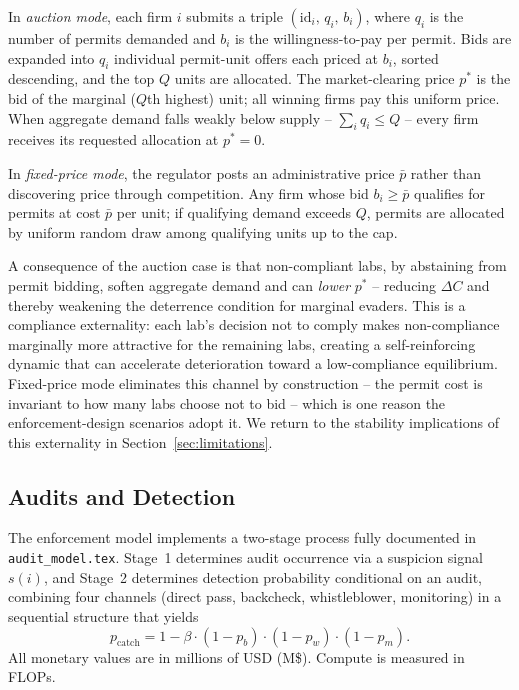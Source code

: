 In \emph{auction mode}, each firm $i$ submits a triple $(\text{id}_i,\, q_i,\, b_i)$, where $q_i$ is the number of permits demanded and $b_i$ is the willingness-to-pay per permit. Bids are expanded into $q_i$ individual permit-unit offers each priced at $b_i$, sorted descending, and the top $Q$ units are allocated. The market-clearing price $p^*$ is the bid of the marginal ($Q$th highest) unit; all winning firms pay this uniform price. When
aggregate demand falls weakly below supply -- $\sum_i q_i \leq Q$ -- every firm receives its requested allocation at $p^* = 0$.

In \emph{fixed-price mode}, the regulator posts an administrative price $\bar{p}$ rather than discovering price through competition. Any firm whose bid $b_i \geq \bar{p}$ qualifies for permits at cost $\bar{p}$ per unit; if qualifying demand exceeds $Q$, permits are allocated by uniform random draw among qualifying units up to the cap. 

A consequence of the auction case is that non-compliant labs, by abstaining from permit bidding, soften aggregate demand and can \emph{lower} $p^*$ -- reducing $\Delta C$ and thereby weakening the deterrence condition for marginal evaders. This is a compliance externality: each lab's decision not to comply makes non-compliance marginally more attractive for the remaining labs, creating a self-reinforcing dynamic that can accelerate deterioration toward a low-compliance equilibrium. Fixed-price mode eliminates this channel by construction -- the permit cost is invariant to how many labs choose not to bid -- which is one reason the enforcement-design scenarios adopt it. We return to the stability implications of this externality in Section~\ref{sec:limitations}.

\subsection{Audits and Detection}
The enforcement model implements a two-stage process fully documented in \\ \texttt{audit\_model.tex}. Stage~1 determines audit occurrence via a suspicion signal $s(i)$, and Stage~2 determines detection probability conditional on an audit, combining four channels (direct pass, backcheck, whistleblower, monitoring) in a sequential structure that yields
\begin{equation}
p_{\text{catch}} = 1 - \beta \cdot (1 - p_b) \cdot (1 - p_w) \cdot (1 - p_m).
\end{equation}
All monetary values are in millions of USD (M\$). Compute is measured in FLOPs.

